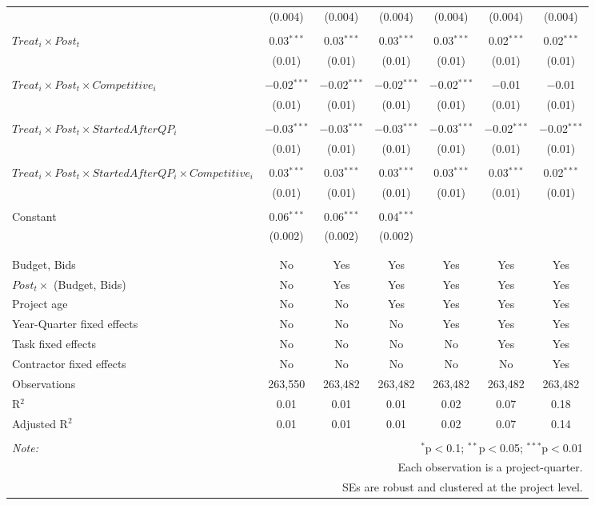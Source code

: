 \documentclass[
]{article}
\begin{document}
\begin{table}[H]
\begin{tabular}{@{\extracolsep{-3pt}}lcccccc}
  & (0.004) & (0.004) & (0.004) & (0.004) & (0.004) & (0.004) \\ 
  & & & & & & \\ 
 $Treat_i \times Post_t$ & 0.03$^{***}$ & 0.03$^{***}$ & 0.03$^{***}$ & 0.03$^{***}$ & 0.02$^{***}$ & 0.02$^{***}$ \\ 
  & (0.01) & (0.01) & (0.01) & (0.01) & (0.01) & (0.01) \\ 
  & & & & & & \\ 
 $Treat_i \times Post_t \times Competitive_i$ & $-$0.02$^{***}$ & $-$0.02$^{***}$ & $-$0.02$^{***}$ & $-$0.02$^{***}$ & $-$0.01 & $-$0.01 \\ 
  & (0.01) & (0.01) & (0.01) & (0.01) & (0.01) & (0.01) \\ 
  & & & & & & \\ 
 $Treat_i \times Post_t \times StartedAfterQP_i$ & $-$0.03$^{***}$ & $-$0.03$^{***}$ & $-$0.03$^{***}$ & $-$0.03$^{***}$ & $-$0.02$^{***}$ & $-$0.02$^{***}$ \\ 
  & (0.01) & (0.01) & (0.01) & (0.01) & (0.01) & (0.01) \\ 
  & & & & & & \\ 
 $Treat_i \times Post_t \times StartedAfterQP_i \times Competitive_i$ & 0.03$^{***}$ & 0.03$^{***}$ & 0.03$^{***}$ & 0.03$^{***}$ & 0.03$^{***}$ & 0.02$^{***}$ \\ 
  & (0.01) & (0.01) & (0.01) & (0.01) & (0.01) & (0.01) \\ 
  & & & & & & \\ 
 Constant & 0.06$^{***}$ & 0.06$^{***}$ & 0.04$^{***}$ &  &  &  \\ 
  & (0.002) & (0.002) & (0.002) &  &  &  \\ 
  & & & & & & \\ 
\hline \\[-1.8ex] 
Budget, Bids & No & Yes & Yes & Yes & Yes & Yes \\ 
$Post_t \times $  (Budget, Bids) & No & Yes & Yes & Yes & Yes & Yes \\ 
Project age & No & No & Yes & Yes & Yes & Yes \\ 
Year-Quarter fixed effects & No & No & No & Yes & Yes & Yes \\ 
Task fixed effects & No & No & No & No & Yes & Yes \\ 
Contractor fixed effects & No & No & No & No & No & Yes \\ 
Observations & 263,550 & 263,482 & 263,482 & 263,482 & 263,482 & 263,482 \\ 
R$^{2}$ & 0.01 & 0.01 & 0.01 & 0.02 & 0.07 & 0.18 \\ 
Adjusted R$^{2}$ & 0.01 & 0.01 & 0.01 & 0.02 & 0.07 & 0.14 \\ 
\hline 
\hline \\[-1.8ex] 
\textit{Note:}  & \multicolumn{6}{r}{$^{*}$p$<$0.1; $^{**}$p$<$0.05; $^{***}$p$<$0.01} \\ 
 & \multicolumn{6}{r}{Each observation is a project-quarter.} \\ 
 & \multicolumn{6}{r}{SEs are robust and clustered at the project level.} \\ 
\end{tabular} 
\end{table}
\end{document}

